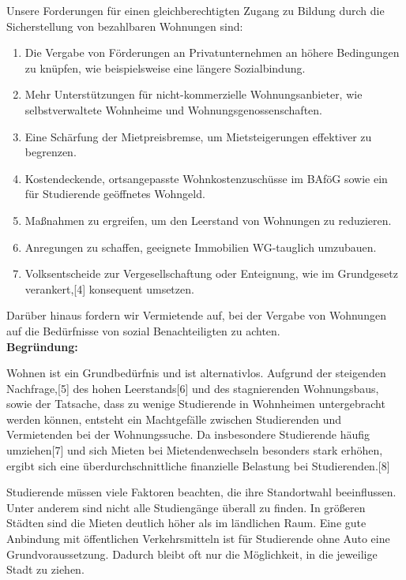 \documentclass[DIV=calc]{scrartcl}
\begin{document}
 Unsere Forderungen für einen gleichberechtigten Zugang zu Bildung durch die
 Sicherstellung von bezahlbaren Wohnungen sind:

\begin{enumerate}
    \item Die Vergabe von Förderungen an Privatunternehmen an höhere Bedingungen zu knüpfen, wie beispielsweise eine längere Sozialbindung.
    \item Mehr Unterstützungen für nicht-kommerzielle Wohnungsanbieter, wie selbstverwaltete Wohnheime und Wohnungsgenossenschaften.
    \item Eine Schärfung der Mietpreisbremse, um Mietsteigerungen effektiver zu begrenzen.
    \item Kostendeckende, ortsangepasste Wohnkostenzuschüsse im BAföG sowie ein für Studierende geöffnetes Wohngeld.
    \item Maßnahmen zu ergreifen, um den Leerstand von Wohnungen zu reduzieren.
    \item Anregungen zu schaffen, geeignete Immobilien WG-tauglich umzubauen.
    \item Volksentscheide zur Vergesellschaftung oder Enteignung, wie im Grundgesetz verankert,[4] konsequent umsetzen.
\end{enumerate}

 Darüber hinaus fordern wir Vermietende auf, bei der Vergabe von Wohnungen auf die
 Bedürfnisse von sozial Benachteiligten zu achten.\\

 \textbf{Begründung:}

 Wohnen ist ein Grundbedürfnis und ist alternativlos. Aufgrund der steigenden
 Nachfrage,[5] des hohen Leerstands[6] und des stagnierenden Wohnungsbaus, sowie der
 Tatsache, dass zu wenige Studierende in Wohnheimen untergebracht werden können,
 entsteht ein Machtgefälle zwischen Studierenden und Vermietenden bei der
 Wohnungssuche. Da insbesondere Studierende häufig umziehen[7] und sich Mieten bei
 Mietendenwechseln besonders stark erhöhen, ergibt sich eine überdurchschnittliche
 finanzielle Belastung bei Studierenden.[8]

 Studierende müssen viele Faktoren beachten, die ihre Standortwahl beeinflussen. Unter
 anderem sind nicht alle Studiengänge überall zu finden. In größeren Städten sind die
 Mieten deutlich höher als im ländlichen Raum. Eine gute Anbindung mit öffentlichen
 Verkehrsmitteln ist für Studierende ohne Auto eine Grundvoraussetzung. Dadurch bleibt
 oft nur die Möglichkeit, in die jeweilige Stadt zu ziehen.
\end{document}

